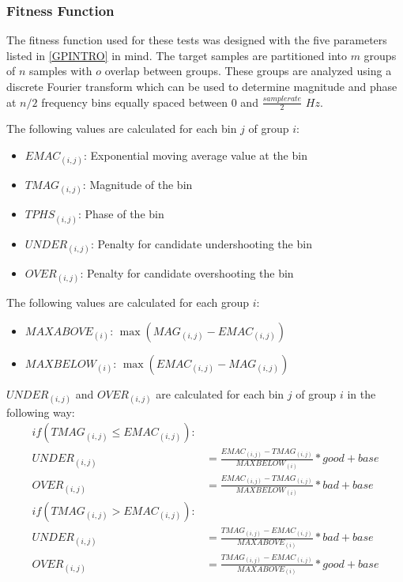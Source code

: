 \documentclass[12pt]{article}
\begin{document}
\subsubsection{Fitness Function}
The fitness function used for these tests was designed with the five parameters listed in \ref{GPINTRO} in mind. The target samples are partitioned into $m$ groups of $n$ samples with $o$ overlap between groups. These groups are analyzed using a discrete Fourier transform which can be used to determine magnitude and phase at $n/2$ frequency bins equally spaced between $0$ and $\frac{sample rate}{2}$ $Hz$.

The following values are calculated for each bin $j$ of group $i$:
\begin{itemize}
\addtolength{\itemindent}{1cm}
\vspace{-3mm}
\item $EMAC_{(i, j)}$: Exponential moving average value at the bin
\vspace{-3mm}
\item $TMAG_{(i, j)}$: Magnitude of the bin
\vspace{-3mm}
\item $TPHS_{(i, j)}$: Phase of the bin
\vspace{-3mm}
\item $UNDER_{(i, j)}$: Penalty for candidate undershooting the bin
\vspace{-3mm}
\item $OVER_{(i, j)}$: Penalty for candidate overshooting the bin
\vspace{-2mm}
\end{itemize}

The following values are calculated for each group $i$:
\begin{itemize}
\addtolength{\itemindent}{1cm}
\vspace{-3mm} 
\item $MAXABOVE_{(i)}$: $\max{(MAG_{(i, j)} - EMAC_{(i, j)})}$
\vspace{-3mm} 
\item $MAXBELOW_{(i)}$: $\max{(EMAC_{(i, j)} - MAG_{(i, j)})}$
\vspace{-2mm}
\end{itemize}

$UNDER_{(i, j)}$ and $OVER_{(i, j)}$ are calculated for each bin $j$ of group $i$ in the following way:
\vspace{-3mm} 
\begin{align*}
if (TMAG_{(i, j)} \le EMAC_{(i, j)}): \\
UNDER_{(i, j)} &= \frac{EMAC_{(i, j)} - TMAG_{(i, j)}}{MAXBELOW_{(i)}} * good + base \\
OVER_{(i, j)} &= \frac{EMAC_{(i, j)} - TMAG_{(i, j)}}{MAXBELOW_{(i)}} * bad + base \\
if (TMAG_{(i, j)} > EMAC_{(i, j)}): \\
UNDER_{(i, j)} &= \frac{TMAG_{(i, j)} - EMAC_{(i, j)}}{MAXABOVE_{(i)}} * bad + base \\
OVER_{(i, j)} &= \frac{TMAG_{(i, j)} - EMAC_{(i, j)}}{MAXABOVE_{(i)}} * good + base
\end{align*}
\vspace{-2mm}
\end{document}
